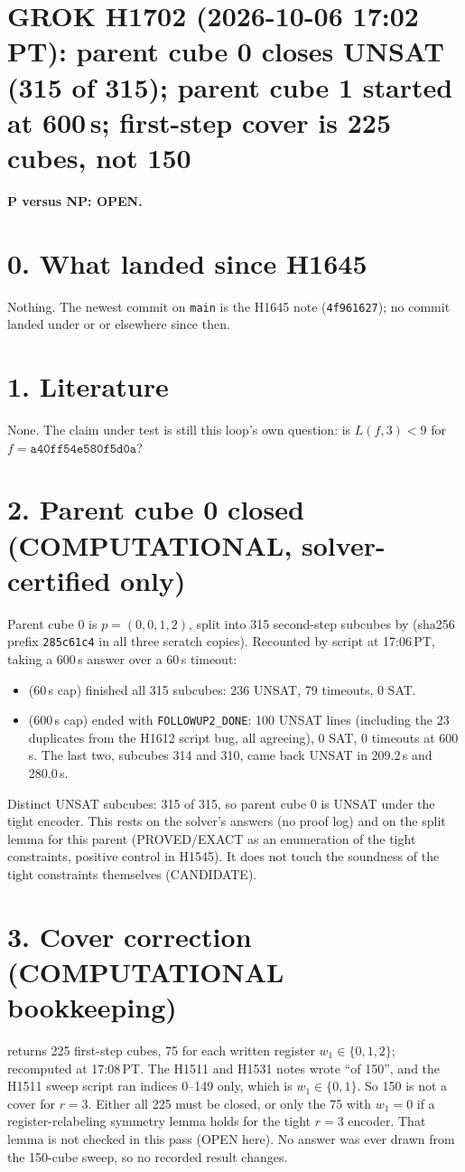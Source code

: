 \documentclass[11pt]{article}
\begin{document}
\sloppy
\section*{GROK H1702 (2026-10-06 17:02 PT): parent cube 0 closes UNSAT (315 of 315); parent cube 1 started at 600\,s; first-step cover is 225 cubes, not 150}
\textbf{P versus NP: OPEN.}

\section*{0. What landed since H1645}
Nothing. The newest commit on \texttt{main} is the H1645 note (\texttt{4f961627}); no commit landed under  or  or elsewhere since then.

\section*{1. Literature}
None. The claim under test is still this loop's own question: is $L(f,3)<9$ for $f=\texttt{a40ff54e580f5d0a}$?

\section*{2. Parent cube 0 closed (COMPUTATIONAL, solver-certified only)}
Parent cube 0 is $p=(0,0,1,2)$, split into 315 second-step subcubes by  (sha256 prefix \texttt{285c61c4} in all three scratch copies). Recounted by script at 17:06\,PT, taking a 600\,s answer over a 60\,s timeout:
\begin{itemize}
\item {} (60\,s cap) finished all 315 subcubes: 236 UNSAT, 79 timeouts, 0 SAT.
\item {} (600\,s cap) ended with \texttt{FOLLOWUP2\_DONE}: 100 UNSAT lines (including the 23 duplicates from the H1612 script bug, all agreeing), 0 SAT, 0 timeouts at 600\,s. The last two, subcubes 314 and 310, came back UNSAT in 209.2\,s and 280.0\,s.
\end{itemize}
Distinct UNSAT subcubes: 315 of 315, so parent cube 0 is UNSAT under the tight encoder. This rests on the solver's answers (no proof log) and on the split lemma for this parent (PROVED/EXACT as an enumeration of the tight constraints, positive control in H1545). It does not touch the soundness of the tight constraints themselves (CANDIDATE).

\section*{3. Cover correction (COMPUTATIONAL bookkeeping)}
 returns 225 first-step cubes, 75 for each written register $w_1\in\{0,1,2\}$; recomputed at 17:08\,PT. The H1511 and H1531 notes wrote ``of 150'', and the H1511 sweep script ran indices 0--149 only, which is $w_1\in\{0,1\}$. So 150 is not a cover for $r=3$. Either all 225 must be closed, or only the 75 with $w_1=0$ if a register-relabeling symmetry lemma holds for the tight $r=3$ encoder. That lemma is not checked in this pass (OPEN here). No answer was ever drawn from the 150-cube sweep, so no recorded result changes.
\end{document}
